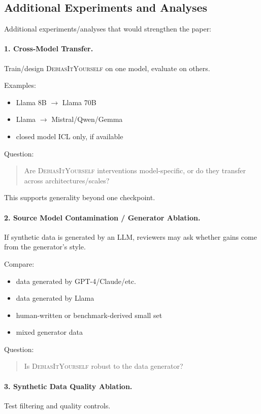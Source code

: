 \documentclass[11pt]{article}
\newcommand{\diy}{\textsc{DebiasItYourself}}
\begin{document}
\subsection{Additional Experiments and Analyses}

Additional experiments/analyses that would strengthen the paper:

\paragraph{1. Cross-Model Transfer.}
Train/design \diy{} on one model, evaluate on others.

Examples:
\begin{itemize}[leftmargin=1.4em,itemsep=1pt,topsep=2pt]
    \item Llama 8B $\rightarrow$ Llama 70B
    \item Llama $\rightarrow$ Mistral/Qwen/Gemma
    \item closed model ICL only, if available
\end{itemize}

Question:
\begin{quote}
Are \diy{} interventions model-specific, or do they transfer across architectures/scales?
\end{quote}

This supports generality beyond one checkpoint.

\paragraph{2. Source Model Contamination / Generator Ablation.}
If synthetic data is generated by an LLM, reviewers may ask whether gains come from the generator's style.

Compare:
\begin{itemize}[leftmargin=1.4em,itemsep=1pt,topsep=2pt]
    \item data generated by GPT-4/Claude/etc.
    \item data generated by Llama
    \item human-written or benchmark-derived small set
    \item mixed generator data
\end{itemize}

Question:
\begin{quote}
Is \diy{} robust to the data generator?
\end{quote}

\paragraph{3. Synthetic Data Quality Ablation.}
Test filtering and quality controls.
\end{document}
